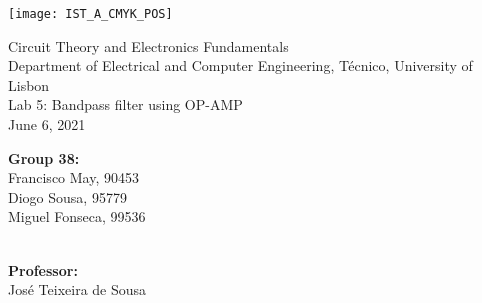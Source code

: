 
\thispagestyle {empty}

\texttt{[image: IST\_A\_CMYK\_POS]}

\begin{center}
%
\vspace{1.0cm}

\vspace{1cm}
{\FontLb Circuit Theory and Electronics Fundamentals} \\ %
\vspace{1cm}
{\FontSn Department of Electrical and Computer Engineering, Técnico, University of Lisbon} \\ %
\vspace{1cm}
{\FontSn Lab 5: Bandpass filter using OP-AMP} \\
\vspace{1cm}
{\FontSn  June 6, 2021} \\ %


        \begin{center}
            \normalsize
            {\textbf{Group 38:}
            \\
             Francisco May, 90453\\
             Diogo Sousa, 95779\\
             Miguel Fonseca, 99536\\
            }
		\end{center}
		
		
        \begin{center}
            \normalsize
            {\textbf{
            \\
             Professor:\\
            }
             José Teixeira de Sousa}
		\end{center}
        \vspace{10pt}

%
\end{center}

